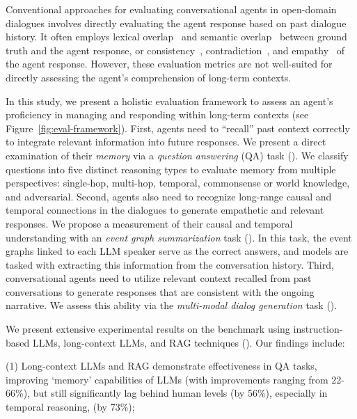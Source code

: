 Conventional approaches for evaluating conversational agents in open-domain dialogues involves directly evaluating the agent response based on past dialogue history.
It often employs lexical overlap~\cite{papineni-etal-2002-bleu} and semantic overlap~\cite{zhang2019bertscore} between ground truth and the agent response, or consistency~\cite{ghazarian2022deam}, contradiction~\cite{nie2021like, welleck2019dialogue}, and empathy~\cite{zhang2021dynaeval, zhang2022fined} of the agent response. However, these evaluation metrics are not well-suited for directly assessing the agent's comprehension of long-term contexts.

In this study, we present a holistic evaluation framework to assess an agent's proficiency in managing and responding within long-term contexts (see Figure~\ref{fig:eval-framework}). First, agents need to ``recall'' past context correctly to integrate relevant information into future responses. We present a direct examination of their \textit{memory} via a \textit{question answering} (QA) task (). We classify questions into five distinct reasoning types to evaluate memory from multiple perspectives: single-hop, multi-hop, temporal, commonsense or world knowledge, and adversarial. Second, agents also need to recognize long-range causal and temporal connections in the dialogues to generate empathetic and relevant responses.
We propose a measurement of their causal and temporal understanding with an \textit{event graph summarization} task (). In this task, the event graphs linked to each LLM speaker serve as the correct answers, and models are tasked with extracting this information from the conversation history. Third, conversational agents need to utilize relevant context recalled from past conversations to generate responses that are consistent with the ongoing narrative. We assess this ability via the \textit{multi-modal dialog generation} task (). 



We present extensive experimental results on the \dataset{} benchmark using instruction-based LLMs, long-context LLMs, and RAG techniques (). 
Our findings include:


(1) Long-context LLMs and RAG demonstrate effectiveness in QA tasks, improving `memory' capabilities of LLMs (with improvements ranging from 22-66\%), but still significantly lag behind human levels (by 56\%), especially in temporal reasoning, (by 73\%); 

